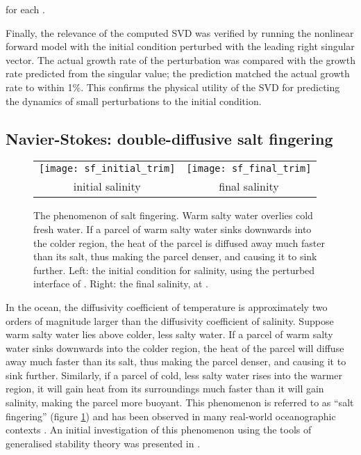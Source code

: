 \documentclass{siamltex}
\begin{document}
for each .

Finally, the relevance of the computed SVD was verified by running the nonlinear forward model
with the initial condition perturbed with the leading right singular vector. The actual growth rate of the perturbation
was compared with the growth rate predicted from the singular value; the prediction matched the actual
growth rate to within 1\%. This confirms the physical utility of the SVD for predicting the dynamics of small perturbations
to the initial condition.

\subsection{Navier-Stokes: double-diffusive salt fingering}

\begin{figure}
  \centering
  \begin{tabular}{cc}
    \texttt{[image: sf\_initial\_trim]} & \texttt{[image: sf\_final\_trim]}
    \\
    initial salinity & final salinity
  \end{tabular}
  \caption{The phenomenon of salt fingering. Warm salty water overlies cold fresh water. If a parcel of warm salty water
  sinks downwards into the colder region, the heat of the parcel is diffused away much faster than its salt, thus making
  the parcel denser, and causing it to sink further. Left: the initial condition for salinity, using the perturbed interface of \cite{ozgokmen1998b}. Right:
  the final salinity, at .}
  \label{fig:salt_fingering}
\end{figure}

In the ocean, the diffusivity coefficient of temperature is approximately two orders of magnitude larger than
the diffusivity coefficient of salinity. Suppose warm salty water lies above colder, less salty water. If a parcel of warm salty water sinks downwards
into the colder region, the heat of the parcel will diffuse away much faster than its salt, thus making the parcel
denser, and causing it to sink further. Similarly, if a parcel of cold, less salty water rises into the warmer
region, it will gain heat from its surroundings much faster than it will gain salinity, making the parcel more
buoyant. This phenomenon is referred to as ``salt fingering'' \cite{stern1960} (figure \ref{fig:salt_fingering}) and has been observed in many
real-world oceanographic contexts \cite{turner1985}. An initial investigation of this phenomenon using the tools
of generalised stability theory was presented in \cite{eisenman2005}.
\end{document}
